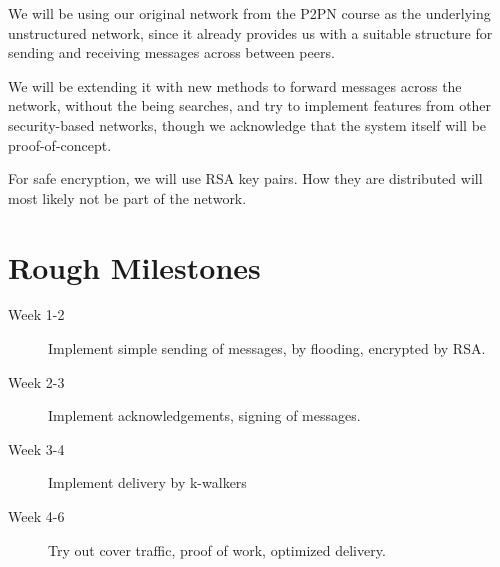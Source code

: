 \documentclass{article}
\begin{document}
We will be using our original network from the P2PN course as the underlying unstructured network, since it already provides us with a suitable structure for sending and receiving messages across between peers.

We will be extending it with new methods to forward messages across the network, without the being searches, and try to implement features from other security-based networks, though we acknowledge that the system itself will be proof-of-concept.

For safe encryption, we will use RSA key pairs. How they are distributed will most likely not be part of the network.

\section{Rough Milestones}

\begin{description}
\item[Week 1-2] Implement simple sending of messages, by flooding, encrypted by RSA.
\item[Week 2-3] Implement acknowledgements, signing of messages.
\item[Week 3-4] Implement delivery by k-walkers
\item[Week 4-6] Try out cover traffic, proof of work, optimized delivery.
\end{description}
\end{document}
